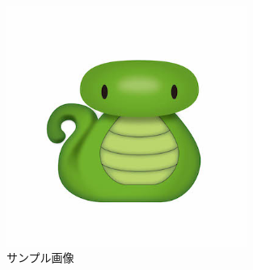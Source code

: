 \documentclass{article}
\begin{document}
\begin{figure}[htbp]
  \centering
  \includegraphics[width=0.7\textwidth]{Its_me.jpg}
  \caption{サンプル画像}
  \label{fig:sample}
\end{figure}
\end{document}
